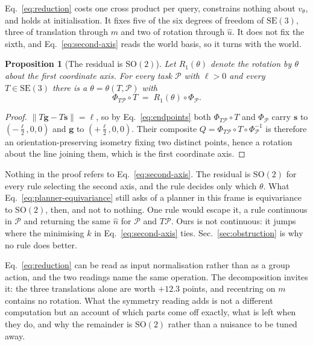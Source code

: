 \documentclass[10pt,twocolumn,letterpaper]{article}
\newcommand{\SE}{\mathrm{SE}(3)}
\newcommand{\svec}{\mathbf{s}}
\newcommand{\gvec}{\mathbf{g}}
\newtheorem{proposition}{Proposition}
\begin{document}
Eq.~\eqref{eq:reduction} costs one cross product per query, constrains nothing
about $v_\theta$, and holds at initialisation. It fixes five of the six degrees
of freedom of $\SE$, three of translation through $m$ and two of rotation
through $\hat{u}$. It does not fix the sixth, and
Eq.~\eqref{eq:second-axis} reads the world basis, so it turns with the world.

\begin{proposition}[The residual is $\mathrm{SO}(2)$]
\label{prop:residual}
Let $R_1(\theta)$ denote the rotation by $\theta$ about the first coordinate
axis. For every task $\mathcal{P}$ with $\ell > 0$ and every $T \in \SE$ there is a
$\theta = \theta(T, \mathcal{P})$ with
\begin{equation}
  \Phi_{T\mathcal{P}} \circ T \;=\; R_1(\theta) \circ \Phi_{\mathcal{P}} .
  \label{eq:residual}
\end{equation}
\end{proposition}
\begin{proof}
$\|T\gvec - T\svec\| = \ell$, so by Eq.~\eqref{eq:endpoints} both
$\Phi_{T\mathcal{P}} \circ T$ and $\Phi_{\mathcal{P}}$ carry $\svec$ to
$(-\tfrac{\ell}{2},0,0)$ and $\gvec$ to $(+\tfrac{\ell}{2},0,0)$. Their composite
$Q = \Phi_{T\mathcal{P}} \circ T \circ \Phi_{\mathcal{P}}^{-1}$ is therefore an
orientation-preserving isometry fixing two distinct points, hence a rotation
about the line joining them, which is the first coordinate axis.
\end{proof}

Nothing in the proof refers to Eq.~\eqref{eq:second-axis}. The residual is
$\mathrm{SO}(2)$ for every rule selecting the second axis, and the rule decides
only which $\theta$. What Eq.~\eqref{eq:planner-equivariance} still asks of a
planner in this frame is equivariance to $\mathrm{SO}(2)$, then, and not to
nothing. One rule would escape it, a rule continuous in $\mathcal{P}$ and
returning the same $\hat{n}$ for $\mathcal{P}$ and $T\mathcal{P}$. Ours is not
continuous: it jumps where the minimising $k$ in Eq.~\eqref{eq:second-axis} ties.
Sec.~\ref{sec:obstruction} is why no rule does better.

Eq.~\eqref{eq:reduction} can be read as input normalisation rather than as a
group action, and the two readings name the same operation. The decomposition
invites it: the three translations alone are worth $+12.3$ points, and recentring
on $m$ contains no rotation. What the symmetry reading adds is not a different
computation but an account of which parts come off exactly, what is left when
they do, and why the remainder is $\mathrm{SO}(2)$ rather than a nuisance to be
tuned away.
\end{document}

